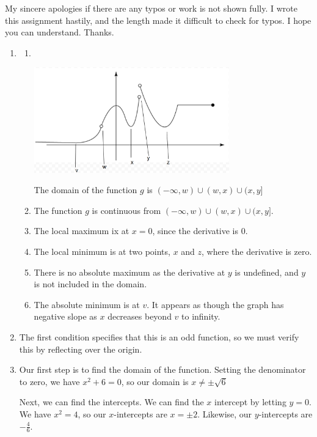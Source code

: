 \documentclass[11pt, letterpaper, twoside]{article}
\begin{document}
\noindent My sincere apologies if there are any typos or work is not shown fully. 
I wrote this assignment hastily, and the length made it difficult to check for typos. 
I hope you can understand. Thanks.
\begin{enumerate}
\item 
\begin{enumerate}[label=\alph*)]
\item ‌‌ 

\vspace{0.2cm}
\includegraphics[width=0.7\textwidth]{q1}\par

The domain of the function \(g\) is \((-\infty, w)\cup(w, x)\cup(x, y]\)
\item The function \(g\) is continuous from \((-\infty, w)\cup(w, x)\cup(x, y]\).
\item The local maximum ix at \(x=0\), since the derivative is 0.
\item The local minimum is at two points, \(x\) and \(z\), where the derivative is zero.
\item There is no absolute maximum as the derivative at \(y\) is undefined, and \(y\) is not included in the domain.
\item The absolute minimum is at \(v\). It appears as though the graph has negative slope as \(x\) decreases beyond \(v\) to infinity.
\end{enumerate}
\item %
The first condition specifies that this is an odd function, so we must verify this by reflecting over the origin.

\item %
Our first step is to find the domain of the function.
Setting the denominator to zero, we have \(x^2+6=0\), so our domain is \(x\neq\pm\sqrt6\)

Next, we can find the intercepts. We can find the \(x\) intercept by letting \(y=0\).
We have \(x^2=4\), so our \(x\)-intercepts are \(x=\pm2\).
Likewise, our \(y\)-intercepts are \(-\frac{4}{6}\).


\end{enumerate}
\end{document}
